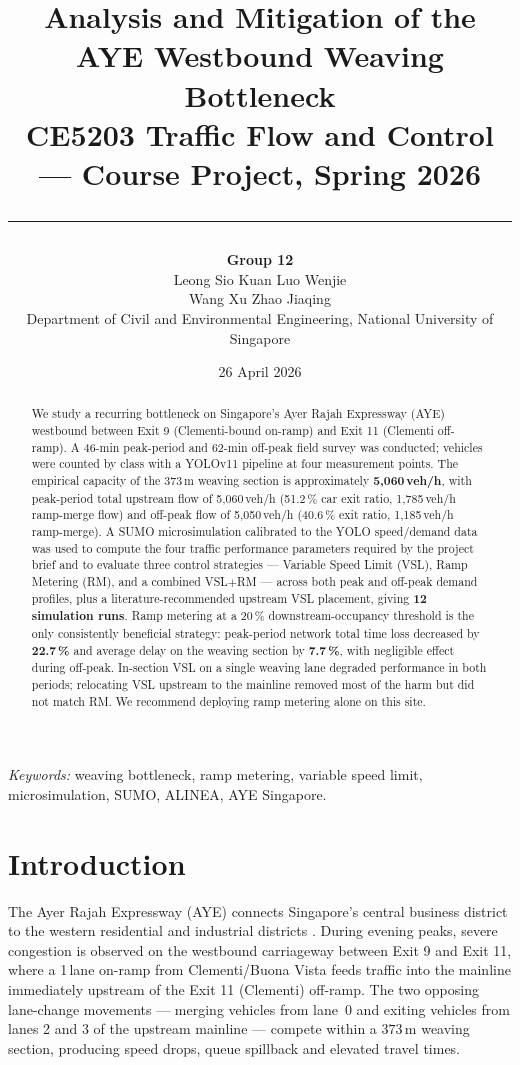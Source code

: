\documentclass[11pt,a4paper]{article}
\title{\vspace{-2em}\textbf{Analysis and Mitigation of the AYE Westbound Weaving Bottleneck}\\[0.4em]
\large CE5203 Traffic Flow and Control --- Course Project, Spring 2026\\[0.6em]
\rule{0.7\textwidth}{0.6pt}}
\author{
\textbf{Group 12} \\[0.2em]
Leong Sio Kuan \quad Luo Wenjie \\[0.2em]
Wang Xu \quad Zhao Jiaqing \\[0.2em]
\small Department of Civil and Environmental Engineering, National University of Singapore
}
\date{26 April 2026}
\begin{document}
\maketitle

\begin{abstract}
\noindent
We study a recurring bottleneck on Singapore's Ayer Rajah Expressway (AYE) westbound between Exit 9 (Clementi-bound on-ramp) and Exit 11 (Clementi off-ramp). A 46-min peak-period and 62-min off-peak field survey was conducted; vehicles were counted by class with a YOLOv11 pipeline at four measurement points. The empirical capacity of the 373\,m weaving section is approximately \textbf{5{,}060\,veh/h}, with peak-period total upstream flow of 5{,}060\,veh/h (51.2\,\% car exit ratio, 1{,}785\,veh/h ramp-merge flow) and off-peak flow of 5{,}050\,veh/h (40.6\,\% exit ratio, 1{,}185\,veh/h ramp-merge). A SUMO microsimulation calibrated to the YOLO speed/demand data was used to compute the four traffic performance parameters required by the project brief and to evaluate three control strategies --- Variable Speed Limit (VSL), Ramp Metering (RM), and a combined VSL$+$RM --- across both peak and off-peak demand profiles, plus a literature-recommended upstream VSL placement, giving \textbf{12 simulation runs}. Ramp metering at a 20\,\% downstream-occupancy threshold is the only consistently beneficial strategy: peak-period network total time loss decreased by \textbf{22.7\,\%} and average delay on the weaving section by \textbf{7.7\,\%}, with negligible effect during off-peak. In-section VSL on a single weaving lane degraded performance in both periods; relocating VSL upstream to the mainline removed most of the harm but did not match RM. We recommend deploying ramp metering alone on this site.
\end{abstract}

\vspace{0.5em}\noindent\textit{Keywords:} weaving bottleneck, ramp metering, variable speed limit, microsimulation, SUMO, ALINEA, AYE Singapore.

\tableofcontents
\newpage

\section{Introduction}
\label{sec:intro}
The Ayer Rajah Expressway (AYE) connects Singapore's central business district to the western residential and industrial districts \cite{onemotoring,bib:aye}. During evening peaks, severe congestion is observed on the westbound carriageway between Exit 9 and Exit 11, where a 1\,lane on-ramp from Clementi/Buona Vista feeds traffic into the mainline immediately upstream of the Exit 11 (Clementi) off-ramp. The two opposing lane-change movements --- merging vehicles from lane~0 and exiting vehicles from lanes 2 and 3 of the upstream mainline --- compete within a $373$\,m weaving section, producing speed drops, queue spillback and elevated travel times.
\end{document}

